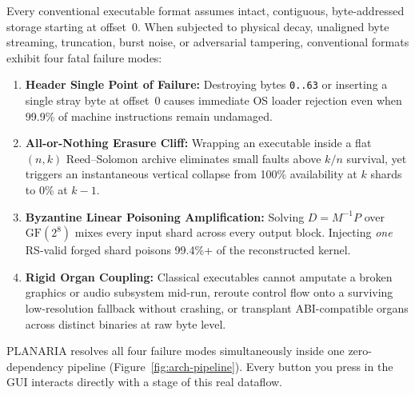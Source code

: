\documentclass[10pt,letterpaper]{article}
\begin{document}
Every conventional executable format assumes intact, contiguous, byte-addressed storage starting at offset~0. When subjected to physical decay, unaligned byte streaming, truncation, burst noise, or adversarial tampering, conventional formats exhibit four fatal failure modes:
\begin{enumerate}[leftmargin=1.6em, itemsep=2pt]
  \item \textbf{Header Single Point of Failure:} Destroying bytes \texttt{0..63} or inserting a single stray byte at offset~0 causes immediate OS loader rejection even when 99.9\% of machine instructions remain undamaged.
  \item \textbf{All-or-Nothing Erasure Cliff:} Wrapping an executable inside a flat $(n,k)$ Reed--Solomon archive eliminates small faults above $k/n$ survival, yet triggers an instantaneous vertical collapse from 100\% availability at $k$ shards to 0\% at $k-1$.
  \item \textbf{Byzantine Linear Poisoning Amplification:} Solving $D = M^{-1} P$ over $\mathrm{GF}(2^8)$ mixes every input shard across every output block. Injecting \emph{one} RS-valid forged shard poisons 99.4\%+ of the reconstructed kernel.
  \item \textbf{Rigid Organ Coupling:} Classical executables cannot amputate a broken graphics or audio subsystem mid-run, reroute control flow onto a surviving low-resolution fallback without crashing, or transplant ABI-compatible organs across distinct binaries at raw byte level.
\end{enumerate}

PLANARIA resolves all four failure modes simultaneously inside one zero-dependency pipeline (Figure~\ref{fig:arch-pipeline}). Every button you press in the GUI interacts directly with a stage of this real dataflow.
\end{document}
